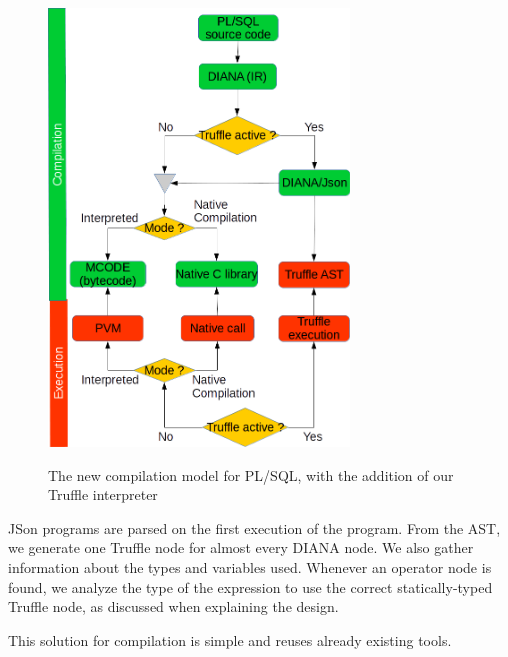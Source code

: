 \documentclass[twoside,11pt,a4paper]{article}
\begin{document}
\begin{figure}[tb]
	\centering
	\includegraphics[width=8cm]{./graphs/CompilationModelExtended.png}
	\label{fig:compmodelext}
	\caption{The new compilation model for PL/SQL, with the addition of our Truffle interpreter}
\end{figure}

JSon programs are parsed on the first execution of the program. From the AST, we generate one Truffle node for almost every DIANA node. We also gather information about the types and variables used. Whenever an operator node is found, we analyze the type of the expression to use the correct statically-typed Truffle node, as discussed when explaining the design.

This solution for compilation is simple and reuses already existing tools.

\end{document}
